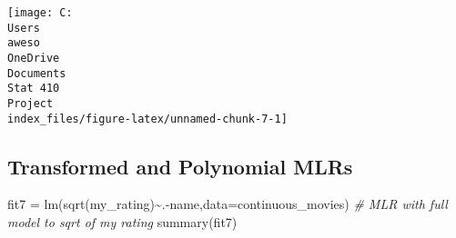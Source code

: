 \documentclass[
]{article}
\newenvironment{Shaded}{\begin{snugshade}}{\end{snugshade}}
\newcommand{\AttributeTok}[1]{\textcolor[rgb]{0.77,0.63,0.00}{#1}}
\newcommand{\CommentTok}[1]{\textcolor[rgb]{0.56,0.35,0.01}{\textit{#1}}}
\newcommand{\FunctionTok}[1]{\textcolor[rgb]{0.00,0.00,0.00}{#1}}
\newcommand{\NormalTok}[1]{#1}
\newcommand{\OtherTok}[1]{\textcolor[rgb]{0.56,0.35,0.01}{#1}}
\newcommand{\SpecialCharTok}[1]{\textcolor[rgb]{0.00,0.00,0.00}{#1}}
\begin{document}
\texttt{[image: C:\\Users\\aweso\\OneDrive\\Documents\\Stat 410\\Project\\index\_files/figure-latex/unnamed-chunk-7-1]}

\hypertarget{transformed-and-polynomial-mlrs}{%
\subsection{Transformed and Polynomial
MLRs}\label{transformed-and-polynomial-mlrs}}

\begin{Shaded}
\begin{Highlighting}[]
\NormalTok{fit7 }\OtherTok{=} \FunctionTok{lm}\NormalTok{(}\FunctionTok{sqrt}\NormalTok{(my\_rating)}\SpecialCharTok{\textasciitilde{}}\NormalTok{.}\SpecialCharTok{{-}}\NormalTok{name,}\AttributeTok{data=}\NormalTok{continuous\_movies) }\CommentTok{\# MLR with full model to sqrt of my rating}
\FunctionTok{summary}\NormalTok{(fit7)}
\end{Highlighting}
\end{Shaded}
\end{document}
